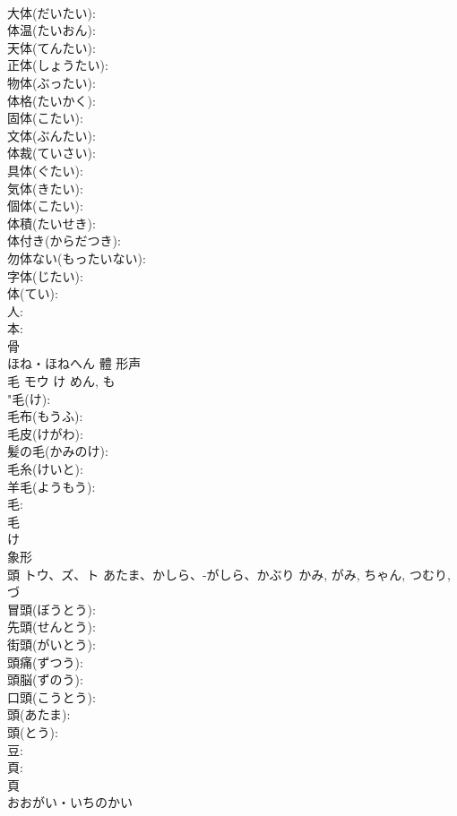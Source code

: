 \documentclass[8pt]{extreport}
\begin{document}
\begin{CJK}{UTF8}{min}
\\	大体(だいたい): 
\\	体温(たいおん): 
\\	天体(てんたい): 
\\	正体(しょうたい): 
\\	物体(ぶったい): 
\\	体格(たいかく): 
\\	固体(こたい): 
\\	文体(ぶんたい): 
\\	体裁(ていさい): 
\\	具体(ぐたい): 
\\	気体(きたい): 
\\	個体(こたい): 
\\	体積(たいせき): 
\\	体付き(からだつき): 
\\	勿体ない(もったいない): 
\\	字体(じたい): 
\\	体(てい): 
\\	人: 
\\	本: 
\\	骨	
\\	ほね・ほねへん	體	形声 
\\	毛	モウ	け	めん, も	
\\	"毛(け): 
\\	毛布(もうふ): 
\\	毛皮(けがわ): 
\\	髪の毛(かみのけ): 
\\	毛糸(けいと): 
\\	羊毛(ようもう): 
\\	毛: 
\\	毛	
\\	け	
\\	象形 
\\	頭	トウ、ズ、ト	あたま、かしら、-がしら、かぶり	かみ, がみ, ちゃん, つむり, づ	
\\	冒頭(ぼうとう): 
\\	先頭(せんとう): 
\\	街頭(がいとう): 
\\	頭痛(ずつう): 
\\	頭脳(ずのう): 
\\	口頭(こうとう): 
\\	頭(あたま): 
\\	頭(とう): 
\\	豆: 
\\	頁: 
\\	頁	
\\	おおがい・いちのかい	

\end{CJK}
\end{document}
